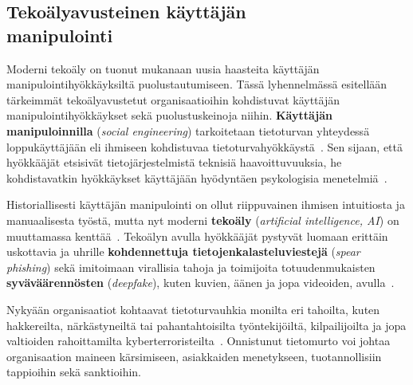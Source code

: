 

\begin{otherlanguage}{finnish}
\chapter*{Tekoälyavusteinen käyttäjän\\manipulointi\label{chapter:finnish}}

Moderni tekoäly on tuonut mukanaan uusia haasteita käyttäjän manipulointihyökkäyksiltä puolustautumiseen. Tässä lyhennelmässä esitellään tärkeimmät tekoälyavustetut organisaatioihin kohdistuvat käyttäjän manipulointihyökkäykset sekä puolustuskeinoja niihin. \textbf{Käyttäjän manipuloinnilla} (\textit{social engineering}) tarkoitetaan tietoturvan yhteydessä loppukäyttäjään eli ihmiseen kohdistuvaa tietoturvahyökkäystä~\citep{hatfield_SE_Evolution_Concept_2018}. Sen sijaan, että hyökkääjät etsisivät tietojärjestelmistä teknisiä haavoittuvuuksia, he kohdistavatkin hyökkäykset käyttäjään hyödyntäen psykologisia menetelmiä~\citep{wang_Defining_Social_Engineering_2020}.

Historiallisesti käyttäjän manipulointi on ollut riippuvainen ihmisen intuitiosta ja manuaalisesta työstä, mutta nyt moderni \textbf{tekoäly} (\textit{artificial intelligence, AI}) on muuttamassa kenttää~\citep{blauth_AI_Crime_Overview_Malicious_Use_Abuse_2022, king_AI_Crime_Interdisciplinary_Analysis_2019, mirsky_Threat_Offensive_AI_Organizations_2023}. Tekoälyn avulla hyökkääjät pystyvät luomaan erittäin uskottavia ja uhrille \textbf{kohdennettuja tietojenkalasteluviestejä} (\textit{spear phishing}) sekä imitoimaan virallisia tahoja ja toimijoita totuudenmukaisten \textbf{syväväärennösten} (\textit{deepfake}), kuten kuvien, äänen ja jopa videoiden, avulla~\citep{mirsky_Creation_Detection_Deepfakes_2021}.

Nykyään organisaatiot kohtaavat tietoturvauhkia monilta eri tahoilta, kuten hakkereilta, närkästyneiltä tai pahantahtoisilta työntekijöiltä, kilpailijoilta ja jopa valtioiden rahoittamilta kyberterroristeilta~\citep{mirsky_Threat_Offensive_AI_Organizations_2023}. Onnistunut tietomurto voi johtaa organisaation maineen kärsimiseen, asiakkaiden menetykseen, tuotannollisiin tappioihin sekä sanktioihin.


\end{otherlanguage}
